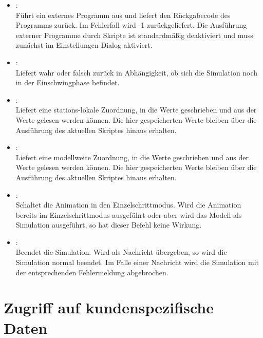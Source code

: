 \begin{itemize}
\item
{}:\\
Führt ein externes Programm aus und liefert den Rückgabecode des Programms zurück.
Im Fehlerfall wird -1 zurückgeliefert.
Die Ausführung externer Programme durch Skripte ist standardmäßig deaktiviert
und muss zunächst im Einstellungen-Dialog aktiviert.

\item
{}:\\
Liefert wahr oder falsch zurück in Abhängigkeit, ob sich die Simulation noch in der Einschwingphase befindet.

\item
{}:\\
Liefert eine stations-lokale Zuordnung, in die Werte geschrieben und aus der Werte gelesen werden können.
Die hier gespeicherten Werte bleiben über die Ausführung des aktuellen Skriptes hinaus erhalten.

\item
{}:\\
Liefert eine modellweite Zuordnung, in die Werte geschrieben und aus der Werte gelesen werden können.
Die hier gespeicherten Werte bleiben über die Ausführung des aktuellen Skriptes hinaus erhalten.

\item
{}:\\
Schaltet die Animation in den Einzelschrittmodus. Wird die Animation bereits im Einzelschrittmodus
ausgeführt oder aber wird das Modell als Simulation ausgeführt, so hat dieser Befehl keine Wirkung.

\item
{}:\\
Beendet die Simulation. Wird als Nachricht  übergeben, so wird die Simulation normal
beendet. Im Falle einer Nachricht wird die Simulation mit der entsprechenden Fehlermeldung abgebrochen.

\end{itemize}

\section{Zugriff auf kundenspezifische Daten}

